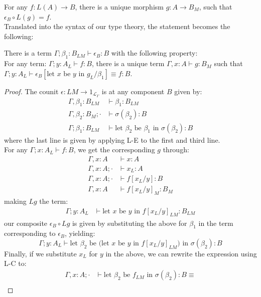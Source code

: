 \documentclass[a4paper,english]{lipics-v2018}
\begin{document}
For any $f : L(A) \to B$, there is a unique morphism $g : A \to B_M$, such that $\epsilon_B \circ L(g) = f$.\\
Translated into the syntax of our type theory, the statement becomes the following:\\
\begin{theorem}[$L \dashv M$]
There is a term $\Gamma; \beta_1 : B_{LM} \vdash \epsilon_B: B$ with the following property:\\
For any term: $\Gamma; y : A_L \vdash f : B$, there is a unique term $\Gamma, x : A \vdash g : B_{M}$ such that $\Gamma; y : A_L \vdash \epsilon_B[\text{let $x$ be $y$ in }g_L/\beta_1] \equiv f : B$.\\
\begin{proof}
 The counit $\epsilon : LM \to 1_{\mathcal{L}_{\Gamma}}$ is at any component $B$ given by:
 \[
  \begin{split}
    \Gamma, \beta_1 : B_{LM} &\vdash \beta_1 : B_{LM}\\
    \Gamma, \beta_2 : B_{M}; \cdot &\vdash \sigma(\beta_2) : B\\
    \Gamma; \beta_1 : B_{LM} &\vdash \text{let $\beta_2$ be $\beta_1$ in }\sigma(\beta_2) : B 
  \end{split}
\]
  where the last line is given by applying L-E to the first and third line.\\
  For any $\Gamma; x : A_L \vdash f : B$, we get the corresponding $g$ through:
  \[
    \begin{split}
      \Gamma, x : A &\vdash x : A\\
      \Gamma, x : A; \cdot &\vdash x_L : A\\
      \Gamma, x : A; \cdot &\vdash f[x_L/y] : B\\
      \Gamma, x : A &\vdash f[x_L/y]_M : B_M
      \end{split}
    \]
    making $Lg$ the term:
\[
  \begin{split}
    \Gamma; y : A_L &\vdash \text{let $x$ be $y$ in } f[x_L/y]_{LM} : B_{LM}
  \end{split}
\]
our composite $\epsilon_B \circ Lg$ is given by substituting the above for $\beta_1$ in the term corresponding to $\epsilon_B$, yielding:
\[
  \Gamma; y : A_L \vdash \text{let $\beta_2$ be (let $x$ be $y$ in $f[x_L/y]_{LM}$) in }\sigma(\beta_2) : B
\]
Finally, if we substitute $x_L$ for $y$ in the above, we can rewrite the expression using L-C to:
\[
  \begin{split}
    \Gamma, x : A; \cdot &\vdash \text{let $\beta_2$ be $f_{LM}$ in }\sigma(\beta_2) : B \equiv \\

\end{split}\]
\end{proof}
\end{theorem}
\end{document}
